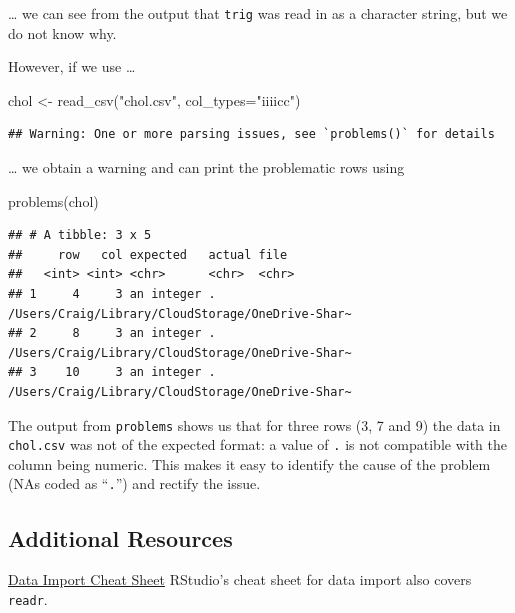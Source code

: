 \documentclass[
]{book}
\newenvironment{Shaded}{\begin{snugshade}}{\end{snugshade}}
\newcommand{\AttributeTok}[1]{\textcolor[rgb]{0.77,0.63,0.00}{#1}}
\newcommand{\FunctionTok}[1]{\textcolor[rgb]{0.00,0.00,0.00}{#1}}
\newcommand{\NormalTok}[1]{#1}
\newcommand{\OtherTok}[1]{\textcolor[rgb]{0.56,0.35,0.01}{#1}}
\newcommand{\StringTok}[1]{\textcolor[rgb]{0.31,0.60,0.02}{#1}}
\begin{document}
\ldots{} we can see from the output that \texttt{trig} was read in as a character string, but we do not know why.

However, if we use \ldots{}

\begin{Shaded}
\begin{Highlighting}[]
\NormalTok{chol }\OtherTok{\textless{}{-}} \FunctionTok{read\_csv}\NormalTok{(}\StringTok{"chol.csv"}\NormalTok{, }\AttributeTok{col\_types=}\StringTok{"iiiicc"}\NormalTok{)}
\end{Highlighting}
\end{Shaded}

\begin{verbatim}
## Warning: One or more parsing issues, see `problems()` for details
\end{verbatim}

\ldots{} we obtain a warning and can print the problematic rows using

\begin{Shaded}
\begin{Highlighting}[]
\FunctionTok{problems}\NormalTok{(chol)}
\end{Highlighting}
\end{Shaded}

\begin{verbatim}
## # A tibble: 3 x 5
##     row   col expected   actual file                                            
##   <int> <int> <chr>      <chr>  <chr>                                           
## 1     4     3 an integer .      /Users/Craig/Library/CloudStorage/OneDrive-Shar~
## 2     8     3 an integer .      /Users/Craig/Library/CloudStorage/OneDrive-Shar~
## 3    10     3 an integer .      /Users/Craig/Library/CloudStorage/OneDrive-Shar~
\end{verbatim}

The output from \texttt{problems} shows us that for three rows (3, 7 and 9) the data in \texttt{chol.csv} was not of the expected format: a value of \texttt{.} is not compatible with the column being numeric. This makes it easy to identify the cause of the problem (NAs coded as ``\texttt{.}'') and rectify the issue.

\hypertarget{additional-resources-1}{%
\subsection{Additional Resources}\label{additional-resources-1}}

\href{\%22https://github.com/rstudio/cheatsheets/raw/main/data-import.pdf\%22}{Data Import Cheat Sheet}
RStudio's cheat sheet for data import also covers \texttt{readr}.
\end{document}
